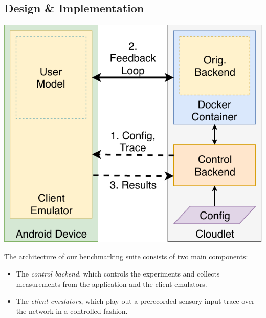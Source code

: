 \documentclass[portrait, a1]{KTHEEposter}
\begin{document}
\begin{pcolumns}[3]
\begin{pcolumn}[2]
\begin{pframe}[1.32]
                \section{Design \& Implementation}
                \begin{center}
                    \includegraphics[width=\linewidth]{img/TraceReplay_GenArch}
                \end{center}
                
                The architecture of our benchmarking suite consists of two main components:
                \begin{itemize}
                    \item The \emph{control backend}, which controls the experiments and collects measurements from the application and the client emulators.
                    \item The \emph{client emulators}, which play out a prerecorded sensory input trace over the network in a controlled fashion.
                \end{itemize}
                
            \end{pframe}
        \end{pcolumn}%
        \begin{pcolumn}[3]
            \begin{pframe}[.9]
                \begin{center}
                    
                \end{center}
            \end{pframe}            
        \end{pcolumn}%
        \begin{pcolumn}[2]
            \begin{pframe}

\end{pframe}
\end{pcolumn}
\end{pcolumns}
\end{document}
